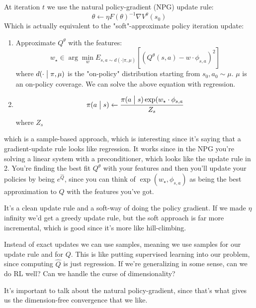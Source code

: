 \documentclass[12pt,reqno]{amsart}
\newcommand{\cond}[2]{( {#1} \bigm\vert {#2})}
\newcommand{\smcond}[2]{( {#1} \vert {#2})}
\begin{document}
At iteration $t$ we use the natural policy-gradient (NPG) update rule:
\begin{equation}
\theta \leftarrow \eta F(\theta)^{-1}\nabla V^\theta(s_0)
\end{equation}
Which is actually equivalent to the "soft"-approximate policy iteration update:
\begin{enumerate}[1.]
\item Approximate $Q^\theta$ with the features:
\begin{equation}
w_\star \in \arg \min_{w} E_{s,a\sim d\smcond{\cdot}{\pi,\mu}}\left[ (Q^\theta (s,a) - w \cdot \phi_{s,a})^2 \right]
\end{equation} where $d\cond{\cdot}{\pi,\mu}$ is the "on-policy" distribution starting from $s_0,a_0 \sim \mu$. $\mu$ is an on-policy coverage. We can solve the above equation with regression.\\
\item \begin{equation}
\pi\cond{a}{s} \leftarrow \frac{\pi\cond{a}{s} \exp(w_\star \cdot \phi_{s,a}}{Z_{s}}
\end{equation}
where $Z_{s}$\\
\end{enumerate}
which is a sample-based approach, which is interesting since it's saying that a gradient-update rule looks like regression. It works since in the NPG you're solving a linear system with a preconditioner, which looks like the update rule in 2. You're finding the best fit $Q^\theta$ with your features and then you'll update your policies by being $e^{\hat{Q}}$, since you can think of $\exp(w_\star,\phi_{s,a})$ as being the best approximation to $Q$ with the features you've got.

It's a clean update rule and a soft-way of doing the policy gradient. If we made $\eta$ infinity we'd get a greedy update rule, but the soft approach is far more incremental, which is good since it's more like hill-climbing. 

Instead of exact updates we can use samples, meaning we use samples for our update rule and for $Q$. This is like putting supervised learning into our problem, since computing $\hat{Q}$ is just regression. If we're generalizing in some sense, can we do RL well? Can we handle the curse of dimensionality? 

It's important to talk about the natural policy-gradient, since that's what gives us the dimension-free convergence that we like.
\end{document}
